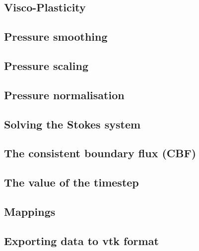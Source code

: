 \documentclass[a4paper]{article}
\begin{document}
\subsection{Visco-Plasticity}  %
\newpage %
\subsection{Pressure smoothing}  %
\newpage %
\subsection{Pressure scaling}  %
\newpage %
\subsection{Pressure normalisation\label{ss_pnorm}}  %
\newpage %
\subsection{Solving the Stokes system \label{sec:solvers}}  %
\newpage %
\subsection{The consistent boundary flux (CBF)}  %
\newpage %
\subsection{The value of the timestep}  %
\newpage %
\subsection{Mappings}  %
\newpage %
\subsection{Exporting data to vtk format}  %
\newpage %
\end{document}
